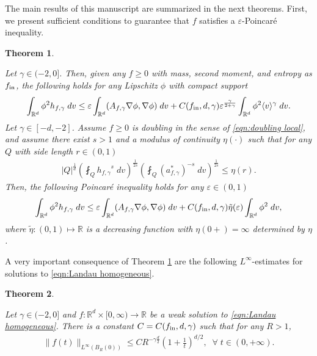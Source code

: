 \documentclass[12pt,american]{amsart}
\numberwithin{equation}{section}
\theoremstyle{plain}
\newtheorem{thm}{Theorem}[section]
\theoremstyle{definition}                  %
\def\fin{f_{\textnormal{in}}}
\begin{document}
  The main results of this manuscript are summarized in the next theorems. First, we present sufficient conditions to guarantee that $f$ satisfies a $\varepsilon$-Poincar\'e inequality.
\begin{thm}\label{thm:sufficient conditions for the Poincare inequality}

  Let $\gamma\in (-2,0]$. Then, given any $f\geq 0$ with mass, second moment, and entropy as $\fin$, the following holds for any Lipschitz $\phi$ with compact support
  \begin{align}\label{eqn:epsilon_Poincare_inequality gamma>-2}
    \int_{\mathbb{R}^d} \phi^2 h_{f,\gamma} \;dv \leq \varepsilon \int_{\mathbb{R}^d} (A_{f,\gamma}\nabla\phi,\nabla\phi)\;dv + C(\fin,d,\gamma)\varepsilon^{\frac{\gamma}{2+\gamma}}\int_{\mathbb{R}^d}\phi^2\langle v\rangle ^\gamma\;dv.
  \end{align} 
  Let $\gamma \in [-d,-2]$. Assume $f\geq 0$ is doubling in the sense of \eqref{eqn:doubling local}, and assume there exist $s>1$ and a modulus of continuity $\eta(\cdot)$ such that for any $Q$ with side length $r\in(0,1)$
 \begin{align*}
    |Q|^{\frac{1}{d}} \left( \fint_{Q}{h_{f,\gamma}}^s\;dv\right)^{\frac{1}{2s}}\left(\fint_{Q}(a_{f,\gamma}^*)^{-s}\;dv\right)^{\frac{1}{2s}}  \leq \eta(r).
  \end{align*}	
  Then, the following Poincar\'e inequality holds for any $\varepsilon \in (0,1)$
  \begin{align}\label{eqn:epsilon_Poincare_inequality strongerII_bounded}
    \int_{\mathbb{R}^d} \phi^2h_{f,\gamma} \;dv \leq \varepsilon \int_{\mathbb{R}^d} (A_{f,\gamma}\nabla\phi,\nabla\phi)\;dv + C(\fin,d,\gamma)\tilde \eta(\varepsilon)\int_{\mathbb{R}^d}	\phi^2\;dv,
  \end{align} 
  where $\tilde \eta:(0,1)\mapsto\mathbb{R}$ is a decreasing function with $\eta(0+)=\infty$ determined by $\eta$.
\end{thm}
A very important consequence of Theorem \ref{thm:sufficient conditions for the Poincare inequality} are the following $L^\infty$-estimates for solutions to \eqref{eqn:Landau homogeneous}. 

\begin{thm}\label{thm:main_1} 

Let $\gamma \in (-2,0]$ and $f:\mathbb{R}^d\times [0,\infty)\to\mathbb{R}$ be a weak solution to \eqref{eqn:Landau homogeneous}. There is a constant $C=C(\fin,d,\gamma)$ such that for any $R>1$,
  \begin{align*}
    \|f(t)\|_{L^\infty(B_R(0))}\leq CR^{-\gamma\tfrac{d}{2}}\left (1+\frac{1}{t}\right )^{d/2},\;\;\forall\;t\in(0,+\infty).	  
  \end{align*}	   	
  
  \end{thm}
  
\end{document}
